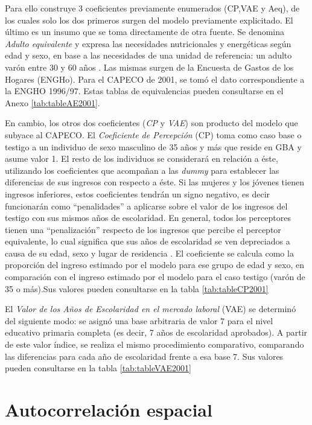 Para ello construye 3 coeficientes previamente enumerados (CP,VAE y Aeq), de los cuales solo los dos primeros surgen del modelo previamente explicitado. El último es un insumo que se toma directamente de otra fuente. Se denomina \textit{Adulto equivalente} y expresa las necesidades nutricionales y energéticas según edad y sexo, en base a las necesidades de una unidad de referencia: un adulto varón entre 30 y 60 años \cite{indec2016b}. Las mismas surgen de la Encuesta de Gastos de los Hogares (ENGHo). Para el CAPECO de 2001, se tomó el dato correspondiente a la ENGHO 1996/97. Estas tablas de equivalencias pueden consultarse en el Anexo \ref{tab:tableAE2001}.

En cambio, los otros dos coeficientes (\textit{CP} y \textit{VAE}) son producto del modelo que subyace al CAPECO. El \textit{Coeficiente de Percepción} (CP) toma como caso base o testigo a un individuo de sexo masculino de 35 años y más que reside en GBA y asume valor 1. El resto de los individuos se considerará en relación a éste, utilizando los coeficientes que acompañan a las \textit{dummy} para establecer las diferencias de sus ingresos con respecto a éste. Si las mujeres y los jóvenes tienen ingresos inferiores, estos coeficientes tendrán un signo negativo, es decir funcionarán como “penalidades” a aplicarse sobre el valor de los ingresos del testigo
con sus mismos años de escolaridad. En general, todos los perceptores tienen una “penalización” respecto de los ingresos que percibe el perceptor equivalente, lo cual significa que sus años de escolaridad se ven depreciados a causa de su edad, sexo y lugar de residencia \cite{indec2016b}. El coeficiente se calcula como la proporción del ingreso estimado por el modelo para ese grupo de edad y sexo, en comparación con el ingreso estimado por el modelo para el caso testigo (varón de 35 o más).Sus valores pueden consultarse en la tabla \ref{tab:tableCP2001}


El \textit{Valor de los Años de Escolaridad en el mercado laboral} (VAE) se determinó del siguiente modo: se asignó una base arbitraria de valor 7 para el nivel educativo primaria completa (es decir, 7 años de escolaridad aprobados). A partir de este valor índice, se realiza el mismo procedimiento comparativo, comparando las diferencias para cada año de escolaridad frente a esa base 7. Sus valores pueden consultarse en la tabla \ref{tab:tableVAE2001}
 
 	\section{Autocorrelación espacial}


